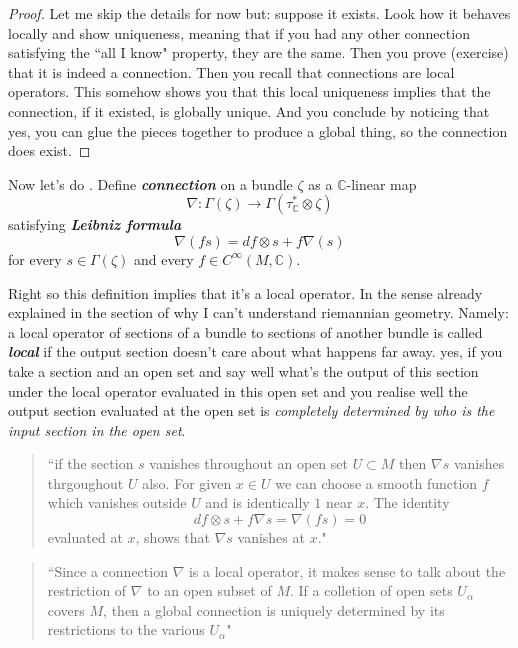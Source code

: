 \begin{proof}\leavevmode
Let me skip the details for now but: suppose it exists. Look how it behaves locally and show uniqueness, meaning that if you had any other connection satisfying the ``all I know" property, they are the same. Then you prove (exercise) that it is indeed a connection. Then you recall that connections are local operators. This somehow shows you that this local uniqueness implies that the connection, if it existed, is globally unique. And you conclude by noticing that yes, you can glue the pieces together to produce a global thing, so the connection does exist.
\end{proof}

Now let's do \cite{mc}. Define \textit{\textbf{connection}} on a bundle \(\zeta\) as a \(\mathbb{C}\)-linear map
\[\nabla:\Gamma(\zeta) \longrightarrow \Gamma(\tau_{\mathbb{C}}^* \otimes \zeta)\]
satisfying \textit{\textbf{Leibniz formula}} 
\[\nabla(fs)=df \otimes s +f \nabla(s)\]
for every \(s \in \Gamma(\zeta)\) and every \(f \in C^\infty(M,\mathbb{C})\).

Right so this definition implies that it's a local operator. In the sense already explained in the section of why I can't understand riemannian geometry. Namely: a local operator of sections of a bundle to sections of another bundle is called \textit{\textbf{local}} if the output section doesn't care about what happens far away. yes, if you take a section and an open set and say well what's the output of this section under the local operator evaluated in this open set and you realise well the output section evaluated at the open set is \textit{completely determined by who is the input section in the open set}.

\begin{quotation}
	``if the section \(s\) vanishes throughout an open set \(U \subset M\) then \(\nabla s\) vanishes thrgoughout \(U\) also. For given \(x \in U\) we can choose a smooth function \(f\) which vanishes outside \(U\) and is identically \(1\) near \(x\). The identity
	\[df \otimes s+ f \nabla s=\nabla(fs)=0\]
evaluated at \(x\), shows that \(\nabla s\) vanishes at \(x\)."	
\end{quotation}
\begin{quotation}
	``Since a connection \(\nabla\) is a local operator, it makes sense to talk about the restriction of \(\nabla\) to an open subset of \(M\). If a colletion of open sets \(U_\alpha\) covers \(M\), then a global connection is uniquely determined by its restrictions to the various \(U_\alpha\)"
\end{quotation}


